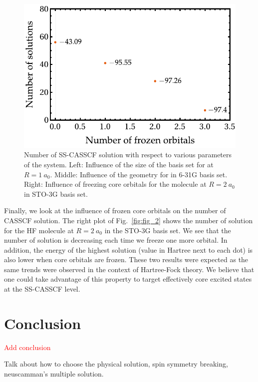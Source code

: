 \documentclass[aip,jcp,reprint,noshowkeys,superscriptaddress]{revtex4-1}
\newcommand{\todo}[1]{\textcolor{red}{#1}}
\begin{document}
\begin{figure}
  \includegraphics[width=0.9\linewidth]{Figures/fig_2c.pdf}
  \caption{Number of SS-CASSCF solution with respect to various parameters of the system. Left: Influence of the size of the basis set for  at $R=1~a_0$. Middle: Influence of the geometry for  in 6-31G basis set. Right: Influence of freezing core orbitals for the  molecule at $R=2~a_0$ in STO-3G basis set. \label{fig:fig_9}}
\end{figure}

Finally, we look at the influence of frozen core orbitals on the number of CASSCF solution.
The right plot of Fig.~\ref{fig:fig_2} shows the number of solution for the HF molecule at $R=2~a_0$ in the STO-3G basis set.
We see that the number of solution is decreasing each time we freeze one more orbital.
In addition, the energy of the highest solution (value in Hartree next to each dot) is also lower when core orbitals are frozen.
These two results were expected as the same trends were observed in the context of Hartree-Fock theory. \cite{Dong_2020}
We believe that one could take advantage of this property to target effectively core excited states at the SS-CASSCF level.


\section{Conclusion}
\label{sec:conclusion}

\todo{Add conclusion}

Talk about how to choose the physical solution, spin symmetry breaking, neuscamman's multiple solution.
\end{document}
